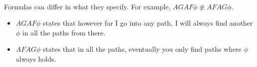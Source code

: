 \documentclass{article}
\theoremstyle{plain}
\theoremstyle{definition}
\begin{document}
\begin{multicols}{2}
\paragraph{} Formulas can differ in what they specify. For example, $AGAF\phi \not\equiv AFAG\phi$.

\begin{itemize}
\item $AGAF\phi$ states that however far I go into any path, I will always find another $\phi$ in all the paths from there. 
\item $AFAG\phi$ states that in all the paths, eventually you only find paths where $\phi$ always holds.
\end{itemize}


\end{multicols}
\end{document}
